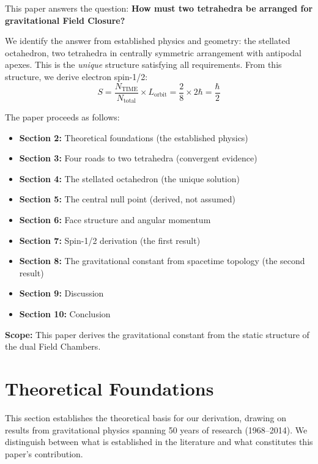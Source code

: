 \documentclass[aps,prd,preprint,superscriptaddress,showpacs,preprintnumbers,amsmath,amssymb,nofootinbib]{revtex4-2}
\begin{document}
This paper answers the question: \textbf{How must two tetrahedra be arranged for gravitational Field Closure?}

We identify the answer from established physics and geometry: the stellated octahedron, two tetrahedra in centrally symmetric arrangement with antipodal apexes. This is the \emph{unique} structure satisfying all requirements. From this structure, we derive electron spin-1/2:
\begin{equation}
S = \frac{N_{\text{TIME}}}{N_{\text{total}}} \times L_{\text{orbit}} = \frac{2}{8} \times 2\hbar = \frac{\hbar}{2}
\end{equation}

The paper proceeds as follows:

\begin{itemize}
\item \textbf{Section 2:} Theoretical foundations (the established physics)
\item \textbf{Section 3:} Four roads to two tetrahedra (convergent evidence)
\item \textbf{Section 4:} The stellated octahedron (the unique solution)
\item \textbf{Section 5:} The central null point (derived, not assumed)
\item \textbf{Section 6:} Face structure and angular momentum
\item \textbf{Section 7:} Spin-1/2 derivation (the first result)
\item \textbf{Section 8:} The gravitational constant from spacetime topology (the second result)
\item \textbf{Section 9:} Discussion
\item \textbf{Section 10:} Conclusion
\end{itemize}

\textbf{Scope:} This paper derives the gravitational constant from the static structure of the dual Field Chambers.

\section{Theoretical Foundations}
\label{sec:foundations}

This section establishes the theoretical basis for our derivation, drawing on results from gravitational physics spanning 50 years of research (1968--2014). We distinguish between what is established in the literature and what constitutes this paper's contribution.
\end{document}
